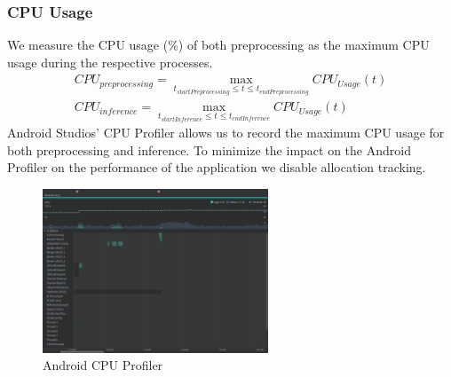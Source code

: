 \subsubsection{CPU Usage}
We measure the CPU usage (\%) of both preprocessing as the maximum CPU usage during the respective processes.
\begin{equation*}
\begin{gathered}
CPU_{preprocessing} = \max\limits_{t_{startPreprocessing} \leq t \leq t_{endPreprocessing}} CPU_{Usage}(t)\\
CPU_{inference} = \max\limits_{t_{startInference} \leq t \leq t_{endInference}} CPU_{Usage}(t)
\end{gathered}
\end{equation*}
Android Studios’ CPU Profiler allows us to record the maximum CPU usage for both preprocessing and inference. To minimize the impact on the Android Profiler on the performance of the application we disable allocation tracking.
\begin{figure}[H]
\centering  
\includegraphics[width=0.6\textwidth]{./Bilder/profiler_CPU}
\caption{Android CPU Profiler}
\label{fig:prof_cpu}
\end{figure}
